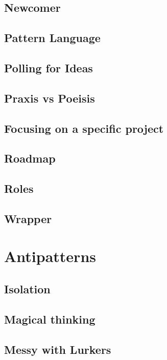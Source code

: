 \documentclass[ebook, 12pt, twoside]{memoir}
\begin{document}
\section*{Newcomer}

\section*{Pattern Language}

\section*{Polling for Ideas}

\section*{Praxis vs Poeisis}

\section*{Focusing on a specific project}

\section*{Roadmap}

\section*{Roles}

\section*{Wrapper}


\chapter[\textbf{Antipatterns}]{Antipatterns}

\section*{Isolation}

\section*{Magical thinking}

\section*{Messy with Lurkers}

\end{document}
